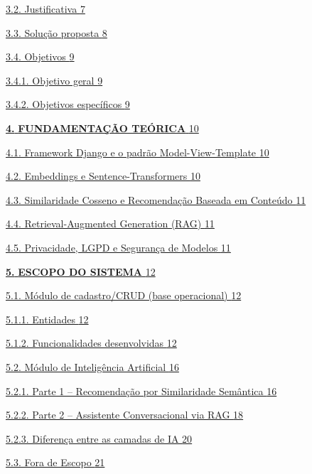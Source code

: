 \documentclass[
]{article}
\begin{document}
\hyperref[_Toc230227804]{3.2. Justificativa \hyperref[_Toc230227804]{7}}

\hyperref[_Toc230227805]{3.3. Solução proposta
\hyperref[_Toc230227805]{8}}

\hyperref[_Toc230227806]{3.4. Objetivos \hyperref[_Toc230227806]{9}}

\hyperref[_Toc230227807]{3.4.1. Objetivo geral
\hyperref[_Toc230227807]{9}}

\hyperref[_Toc230227808]{3.4.2. Objetivos específicos
\hyperref[_Toc230227808]{9}}

\hyperref[_Toc230227809]{\textbf{4.} \textbf{FUNDAMENTAÇÃO TEÓRICA}
\hyperref[_Toc230227809]{10}}

\hyperref[_Toc230227810]{4.1. Framework Django e o padrão
Model-View-Template \hyperref[_Toc230227810]{10}}

\hyperref[_Toc230227811]{4.2. Embeddings e Sentence-Transformers
\hyperref[_Toc230227811]{10}}

\hyperref[_Toc230227812]{4.3. Similaridade Cosseno e Recomendação
Baseada em Conteúdo \hyperref[_Toc230227812]{11}}

\hyperref[_Toc230227813]{4.4. Retrieval-Augmented Generation (RAG)
\hyperref[_Toc230227813]{11}}

\hyperref[_Toc230227814]{4.5. Privacidade, LGPD e Segurança de Modelos
\hyperref[_Toc230227814]{11}}

\hyperref[_Toc230227815]{\textbf{5.} \textbf{ESCOPO DO SISTEMA}
\hyperref[_Toc230227815]{12}}

\hyperref[_Toc230227816]{5.1. Módulo de cadastro/CRUD (base operacional)
\hyperref[_Toc230227816]{12}}

\hyperref[_Toc230227817]{5.1.1. Entidades \hyperref[_Toc230227817]{12}}

\hyperref[_Toc230227818]{5.1.2. Funcionalidades desenvolvidas
\hyperref[_Toc230227818]{12}}

\hyperref[_Toc230227819]{5.2. Módulo de Inteligência Artificial
\hyperref[_Toc230227819]{16}}

\hyperref[_Toc230227820]{5.2.1. Parte 1 -- Recomendação por Similaridade
Semântica \hyperref[_Toc230227820]{16}}

\hyperref[_Toc230227821]{5.2.2. Parte 2 -- Assistente Conversacional via
RAG \hyperref[_Toc230227821]{18}}

\hyperref[_Toc230227822]{5.2.3. Diferença entre as camadas de IA
\hyperref[_Toc230227822]{20}}

\hyperref[_Toc230227823]{5.3. Fora de Escopo
\hyperref[_Toc230227823]{21}}
\end{document}
